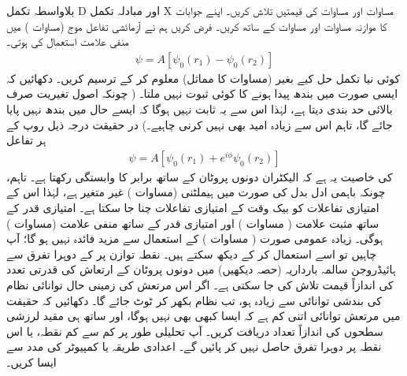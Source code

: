  
بلاواسطہ تکمل D اور مبادلہ تکمل X مساوات  اور مساوات  کی قیمتیں تلاش کریں۔ اپنے جوابات کا موازنہ مساوات  اور مساوات  کے ساتھ کریں۔ 
فرض کریں ہم نے آزمائشی تفاعل موج (مساوات ) میں منفی علامت استعمال کی ہوتی۔
\begin{align}\label{مساوات_تغیریت_منفی_علامت_آزمائشی}
\psi=A[\psi_{0}(r_{1})-\psi_{0}(r_{2})]
\end{align}
 کوئی نیا تکمل حل کیے بغیر (مساوات  کا مماثل)  معلوم کر کے ترسیم کریں۔ دکھائیں کہ ایسی صورت میں بندھ پیدا ہونے کا کوئی ثبوت نہیں ملتا۔ ( چونکہ اصول تغیریت صرف بالائی حد بندی دیتا ہے، لہٰذا اس سے یہ ثابت نہیں ہوگا کہ ایسے حال میں بندھ نہیں پایا جائے گا، تاہم اس سے زیادہ امید بھی نہیں کرنی چاہیے۔)  در حقیقت درجہ ذیل روپ کے ہر تفاعل 
\begin{align}\label{مساوات_تغیریت_ہر_تفاعل}
\psi=A[\psi_{0}(r_{1})+e^{i\phi}\psi_{0}(r_{2})]
\end{align}
 کی خاصیت یہ ہے کہ الیکٹران دونوں پروٹان کے ساتھ برابر کا وابستگی رکھتا ہے۔ تاہم، چونکہ باہمی ادل بدل  کی صورت میں ہیملٹنی (مساوات ) غیر متغیر ہے، لہٰذا اس کے امتیازی تفاعلات کو بیک وقت  کے امتیازی تفاعلات چنا جا سکتا ہے۔ امتیازی قدر  کے ساتھ مثبت علامت
 ( مساوات ) اور امتیازی قدر  کے ساتھ منفی علامت (مساوات ) ہوگی۔ زیادہ عمومی صورت ( مساوات ) کے استعمال سے مزید فائدہ نہیں ہو گا؛ آپ چاہیں تو اسے استعمال کر کے دیکھ سکتے ہیں۔ 
نقطہ توازن پر  کے دوہرا تفرق سے ہائیڈروجن سالمہ بارداریہ (حصہ  دیکھیں) میں دونوں پروٹان کے ارتعاش کی قدرتی تعدد  کی اندازاً قیمت تلاش کی جا سکتی ہے۔ اگر اس مرتعش کی زمینی حال توانائی  نظام کی بندشی توانائی سے زیادہ ہو، تب نظام بکھر کر ٹوٹ جائے گا۔ دکھائیں کہ حقیقت میں مرتعش توانائی اتنی کم ہے کہ ایسا کبھی بھی نہیں ہوگا، اور ساتھ ہی مقید لرزشی سطحوں کی اندازاً تعداد دریافت کریں۔  آپ تحلیلی طور پر کم سے کم نقطہ، یا اس نقطہ پر دوہرا تفرق حاصل نہیں کر پائیں گے۔ اعدادی طریقہ یا کمپیوٹر کی مدد سے ایسا کریں۔

